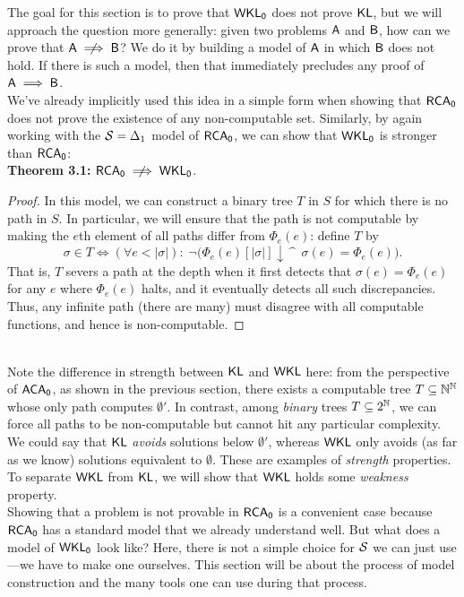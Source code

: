 \documentclass{amsart}
\begin{document}
	The goal for this section is to prove that $\operatorname{\sf{WKL_0}}$ does not prove $\operatorname{\sf{KL}}$, but we will approach the question more generally: given two problems $\sf{A}$ and $\sf{B}$, how can we prove that $\sf{A}\centernot\implies \sf{B}$? We do it by building a model of $\sf{A}$ in which $\sf{B}$ does not hold. If there is such a model, then that immediately precludes any proof of $\sf{A}\implies \sf{B}$.\\
	
	We've already implicitly used this idea in a simple form when showing that $\operatorname{\sf{RCA_0}}$ does not prove the existence of any non-computable set. Similarly, by again working with the $\mathcal{S}=\Delta_1$ model of $\operatorname{\sf{RCA_0}}$, we can show that $\operatorname{\sf{WKL_0}}$ is stronger than $\operatorname{\sf{RCA_0}}$:\\
	
	\noindent \textbf{Theorem 3.1:} $\RCA\centernot\implies \WKL$.
	\begin{proof}
		In this model, we can construct a binary tree $T$ in $S$ for which there is no path in $S$. In particular, we will ensure that the path is not computable by making the $e$th element of all paths differ from $\Phi_e(e)$: define $T$ by 
		$$
		\sigma \in T \iff (\forall e < |\sigma|):\; \neg\big(\Phi_e(e)[|\sigma|]\downarrow \, \^ \;\, \sigma(e) = \Phi_e(e)\big).
		$$
		That is, $T$ severs a path at the depth when it first detects that $\sigma(e)=\Phi_e(e)$ for any $e$ where $\Phi_e(e)$ halts, and it eventually detects all such discrepancies. Thus, any infinite path (there are many) must disagree with all computable functions, and hence is non-computable.
	\end{proof}\\
	
	Note the difference in strength between $\operatorname{\sf{KL}}$ and $\sf{WKL}$ here: from the perspective of $\operatorname{\sf{ACA_0}}$, as shown in the previous section, there exists a computable tree $T\subseteq \mathbb{N}^{\mathbb{N}}$ whose only path computes $\emptyset'$. In contrast, among \textit{binary} trees $T\subseteq 2^{\mathbb{N}}$, we can force all paths to be non-computable but cannot hit any particular complexity. We could say that $\operatorname{\sf{KL}}$ \textit{avoids} solutions below $\emptyset'$, whereas $\sf{WKL}$ only avoids (as far as we know) solutions equivalent to $\emptyset$. These are examples of \textit{strength} properties. To separate $\sf{WKL}$ from $\operatorname{\sf{KL}}$, we will show that $\sf{WKL}$ holds some \textit{weakness} property.\\
	
	Showing that a problem is not provable in $\operatorname{\sf{RCA_0}}$ is a convenient case because $\operatorname{\sf{RCA_0}}$ has a standard model that we already understand well. But what does a model of $\operatorname{\sf{WKL_0}}$ look like? Here, there is not a simple choice for $\mathcal{S}$ we can just use---we have to make one ourselves. This section will be about the process of model construction and the many tools one can use during that process.
	
\end{document}
